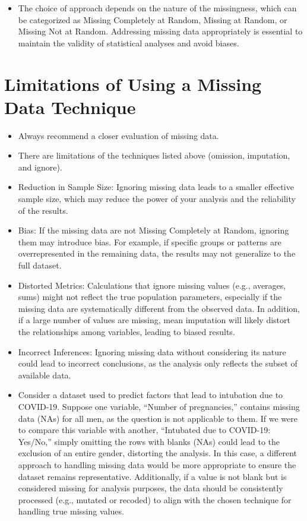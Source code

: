 \documentclass[
  letterpaper,
  DIV=11,
  numbers=noendperiod]{scrreprt}
\providecommand{\tightlist}{%
  \setlength{\itemsep}{0pt}\setlength{\parskip}{0pt}}\usepackage{longtable,booktabs,array}
\begin{document}
\begin{itemize}
\tightlist
\item
  The choice of approach depends on the nature of the missingness, which
  can be categorized as Missing Completely at Random, Missing at Random,
  or Missing Not at Random. Addressing missing data appropriately is
  essential to maintain the validity of statistical analyses and avoid
  biases.
\end{itemize}

\section{Limitations of Using a Missing Data
Technique}\label{limitations-of-using-a-missing-data-technique}

\begin{itemize}
\item
  Always recommend a closer evaluation of missing data.
\item
  There are limitations of the techniques listed above (omission,
  imputation, and ignore).
\item
  Reduction in Sample Size: Ignoring missing data leads to a smaller
  effective sample size, which may reduce the power of your analysis and
  the reliability of the results.
\item
  Bias: If the missing data are not Missing Completely at Random,
  ignoring them may introduce bias. For example, if specific groups or
  patterns are overrepresented in the remaining data, the results may
  not generalize to the full dataset.
\item
  Distorted Metrics: Calculations that ignore missing values (e.g.,
  averages, sums) might not reflect the true population parameters,
  especially if the missing data are systematically different from the
  observed data. In addition, if a large number of values are missing,
  mean imputation will likely distort the relationships among variables,
  leading to biased results.
\item
  Incorrect Inferences: Ignoring missing data without considering its
  nature could lead to incorrect conclusions, as the analysis only
  reflects the subset of available data.
\item
  Consider a dataset used to predict factors that lead to intubation due
  to COVID-19. Suppose one variable, ``Number of pregnancies,'' contains
  missing data (NAs) for all men, as the question is not applicable to
  them. If we were to compare this variable with another, ``Intubated
  due to COVID-19: Yes/No,'' simply omitting the rows with blanks (NAs)
  could lead to the exclusion of an entire gender, distorting the
  analysis. In this case, a different approach to handling missing data
  would be more appropriate to ensure the dataset remains
  representative. Additionally, if a value is not blank but is
  considered missing for analysis purposes, the data should be
  consistently processed (e.g., mutated or recoded) to align with the
  chosen technique for handling true missing values.
\end{itemize}
\end{document}
